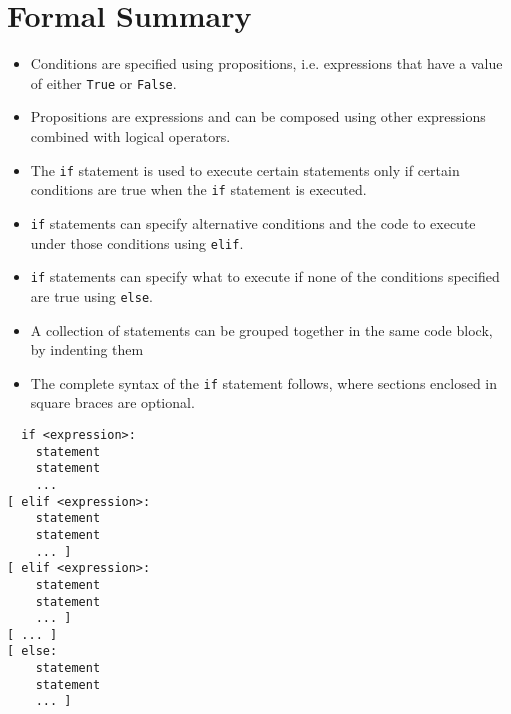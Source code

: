 \section{Formal Summary}
\begin{itemize}
	\item Conditions are specified using propositions, i.e. expressions that have a value of either \texttt{True} or \texttt{False}.
	\item Propositions are expressions and can be composed using other expressions combined with logical operators.
	\item The \texttt{if} statement is used to execute certain statements only if certain conditions are true when the \texttt{if} statement is executed.
	\item \texttt{if} statements can specify alternative conditions and the code to execute under those conditions using \texttt{elif}.
	\item \texttt{if} statements can specify what to execute if none of the conditions specified are true using \texttt{else}.
	\item A collection of statements can be grouped together in the same code block, by indenting them
	\item The complete syntax of the \texttt{if} statement follows, where sections enclosed in square braces are optional.
\end{itemize}
\begin{lstlisting}
  if <expression>:
    statement
    statement
    ...
[ elif <expression>:
    statement
    statement
    ... ]
[ elif <expression>:
    statement
    statement
    ... ]
[ ... ]
[ else:
    statement
    statement
    ... ]
\end{lstlisting}

